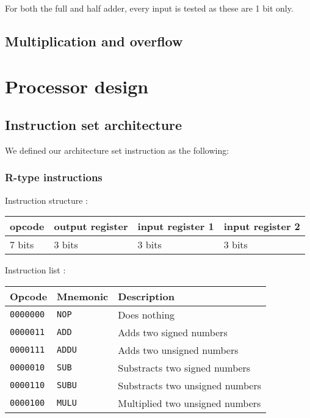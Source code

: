 \documentclass[a4paper]{report}
\begin{document}
	For both the full and half adder, every input is tested as these are 1 bit only. \\

\subsection{}

\subsection{}

\subsection{Multiplication and overflow}

\section{Processor design}

\subsection{Instruction set architecture}

We defined our architecture set instruction as the following:

\subsubsection{R-type instructions}

Instruction structure :

\begin{center}
	\begin{tabular}{|l|l|l|l|}
		\hline
		opcode & output register & input register 1 & input register 2 \\
		\hline
		7 bits & 3 bits & 3 bits & 3 bits \\
		\hline
	\end{tabular}
\end{center}

Instruction list :

\begin{center}
	\begin{tabular}{|l|l|l|}
		\hline
		Opcode & Mnemonic & Description \\
		\hline \hline
		\texttt{0000000} & \texttt{NOP} &  Does nothing \\
		\texttt{0000011} & \texttt{ADD} &  Adds two signed numbers \\
		\texttt{0000111} & \texttt{ADDU} & Adds two unsigned numbers \\
		\texttt{0000010} & \texttt{SUB} &  Substracts two signed numbers \\
		\texttt{0000110} & \texttt{SUBU} & Substracts two unsigned numbers \\
		\texttt{0000100} & \texttt{MULU} & Multiplied two unsigned numbers \\
		\hline
	\end{tabular}
\end{center}
\end{document}
